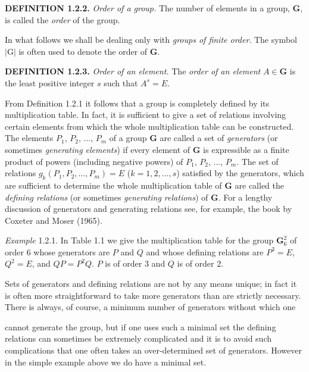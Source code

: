 \documentclass[11pt,a4paper,twoside,openright]{book}
\begin{document}
\textbf{DEFINITION 1.2.2.} \textit{Order of a group.} The number of elements in a group, $\mathbf{G}$, is called the \textit{order} of the group.

In what follows we shall be dealing only with \textit{groups of finite order}. The symbol $|\mathrm{G}|$ is often used to denote the order of $\mathbf{G}$.

\textbf{DEFINITION 1.2.3.} \textit{Order of an element.} The \textit{order of an element} $A \in \mathbf{G}$ is the least positive integer $s$ such that $A^{s} = E$.

From Definition 1.2.1 it follows that a group is completely defined by its multiplication table. In fact, it is sufficient to give a set of relations involving certain elements from which the whole multiplication table can be constructed. The elements $P_{1}$, $P_{2}$, ..., $P_{m}$ of a group $\mathbf{G}$ are called a set of \textit{generators} (or sometimes \textit{generating elements}) if every element of $\mathbf{G}$ is expressible as a finite product of powers (including negative powers) of $P_{1}$, $P_{2}$, ..., $P_{m}$. The set of relations $g_{k}(P_{1}, P_{2}, \ldots, P_{m}) = E$ ($k = 1, 2, \ldots, s$) satisfied by the generators, which are sufficient to determine the whole multiplication table of $\mathbf{G}$ are called the \textit{defining relations} (or sometimes \textit{generating relations}) of $\mathbf{G}$. For a lengthy discussion of generators and generating relations see, for example, the book by Coxeter and Moser (1965).

\textit{Example} 1.2.1. In Table 1.1 we give the multiplication table for the group $\mathbf{G}_6^2$ of order 6 whose generators are $P$ and $Q$ and whose defining relations are $P^{3} = E$, $Q^{2} = E$, and $QP = P^{2}Q$. $P$ is of order 3 and $Q$ is of order 2.

Sets of generators and defining relations are not by any means unique; in fact it is often more straightforward to take more generators than are strictly necessary. There is always, of course, a minimum number of generators without which one

cannot generate the group, but if one uses such a minimal set the defining relations can sometimes be extremely complicated and it is to avoid such complications that one often takes an over-determined set of generators. However in the simple example above we do have a minimal set.
\end{document}
